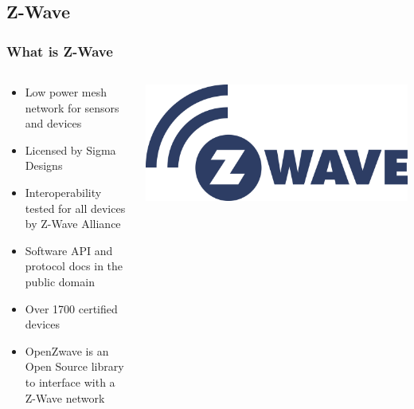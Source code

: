 \documentclass[aspectratio=169,11pt,hyperref={colorlinks=true}]{beamer}
\begin{document}
\subsection{Z-Wave}
\begin{frame}
    \frametitle{What is Z-Wave}
    \begin{columns}
        \begin{column}{.48\textwidth}
            \begin{itemize}
                \item Low power mesh network for sensors and devices
                \item Licensed by Sigma Designs
                \item Interoperability tested for all devices by Z-Wave Alliance
                \item Software API and protocol docs in the public domain
                \item Over 1700 certified devices
                \item OpenZwave is an Open Source library to interface with a Z-Wave network
            \end{itemize}
        \end{column}
        \begin{column}{.48\textwidth}
            \includegraphics[width=\textwidth]{zwave.png}
        \end{column}
    \end{columns}
\end{frame}
\end{document}
